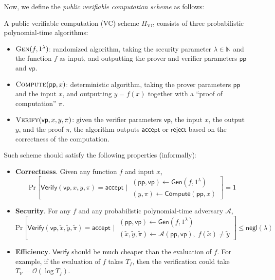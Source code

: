 \documentclass{iacrtrans}
\begin{document}
Now, we define the \textit{public verifiable computation scheme} as follows:
\begin{definition}
  A public verifiable computation (VC) scheme $\Pi_{\text{VC}}$ 
  consists of three probabilistic polynomial-time algorithms:
  \begin{itemize}
    \item $\textsc{Gen}(f,1^{\lambda})$: randomized algorithm, taking the
    security parameter $\lambda \in \mathbb{N}$ and the function $f$ as input,
    and outputting the prover and verifier parameters $\mathsf{pp}$ and
    $\mathsf{vp}$.
    \item $\textsc{Compute}(\mathsf{pp}, x)$: deterministic algorithm, taking
    the prover parameters $\mathsf{pp}$ and the input $x$, and outputting $y=f(x)$ 
    together with a ``proof of computation'' $\pi$.
    \item $\textsc{Verify}(\mathsf{vp}, x, y, \pi)$: given the verifier
    parameters $\mathsf{vp}$, the input $x$, the output $y$, and the proof
    $\pi$, the algorithm outputs $\mathsf{accept}$ or $\mathsf{reject}$ based on
    the correctness of the computation.
  \end{itemize}

  Such scheme should satisfy the following properties (informally):
  \begin{itemize}
    \item \textbf{Correctness}. Given any function $f$ and input $x$,
    \begin{equation*}
      \text{Pr}\left[\mathsf{Verify}(\mathsf{vp}, x, y, \pi) = \mathsf{accept}\; \Big| \; \begin{matrix}
        (\mathsf{pp},\mathsf{vp}) \gets \mathsf{Gen}(f,1^{\lambda}) \\
        (y,\pi) \gets \mathsf{Compute}(\mathsf{pp},x)
      \end{matrix}\right] = 1
    \end{equation*}
    \item \textbf{Security}. For any $f$ and any probabilistic
    polynomial-time adversary $\mathcal{A}$, 
    \begin{equation*}
      \text{Pr}\left[\mathsf{Verify}(\mathsf{vp}, \widetilde{x}, \widetilde{y}, \widetilde{\pi}) = \mathsf{accept}\; \Big| \; \begin{matrix}
        (\mathsf{pp},\mathsf{vp}) \gets \mathsf{Gen}(f,1^{\lambda}) \\
        (\widetilde{x}, \widetilde{y}, \widetilde{\pi}) \gets \mathcal{A}(\mathsf{pp}, \mathsf{vp}), \; f(\widetilde{x}) \neq \widetilde{y}
      \end{matrix}\right] \leq \mathsf{negl}(\lambda)
    \end{equation*}
    \item \textbf{Efficiency}. $\mathsf{Verify}$ should be much cheaper than the
    evaluation of $f$. For example, if the evaluation of $f$ takes $T_f$,
    then the verification could take $T_{\mathcal{V}} = \mathcal{O}(\log T_f)$.
  \end{itemize}
\end{definition}
\end{document}
